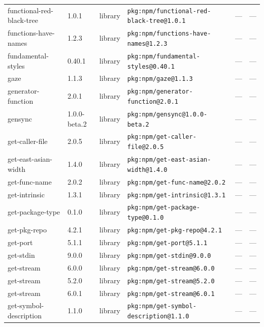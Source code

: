 \documentclass[11pt,a4paper]{article}
\begin{document}
\begin{longtable}{|p{4cm}|p{2cm}|p{1.6cm}|p{5cm}|p{1.5cm}|p{3.5cm}|}
\raggedright functional-red-black-tree & 1.0.1 & library & \small\texttt{pkg:npm/functional-red-black-tree@1.0.1} & — & \small — \\
\raggedright functions-have-names & 1.2.3 & library & \small\texttt{pkg:npm/functions-have-names@1.2.3} & — & \small — \\
\raggedright fundamental-styles & 0.40.1 & library & \small\texttt{pkg:npm/fundamental-styles@0.40.1} & — & \small — \\
\raggedright gaze & 1.1.3 & library & \small\texttt{pkg:npm/gaze@1.1.3} & — & \small — \\
\raggedright generator-function & 2.0.1 & library & \small\texttt{pkg:npm/generator-function@2.0.1} & — & \small — \\
\raggedright gensync & 1.0.0-beta.2 & library & \small\texttt{pkg:npm/gensync@1.0.0-beta.2} & — & \small — \\
\raggedright get-caller-file & 2.0.5 & library & \small\texttt{pkg:npm/get-caller-file@2.0.5} & — & \small — \\
\raggedright get-east-asian-width & 1.4.0 & library & \small\texttt{pkg:npm/get-east-asian-width@1.4.0} & — & \small — \\
\raggedright get-func-name & 2.0.2 & library & \small\texttt{pkg:npm/get-func-name@2.0.2} & — & \small — \\
\raggedright get-intrinsic & 1.3.1 & library & \small\texttt{pkg:npm/get-intrinsic@1.3.1} & — & \small — \\
\raggedright get-package-type & 0.1.0 & library & \small\texttt{pkg:npm/get-package-type@0.1.0} & — & \small — \\
\raggedright get-pkg-repo & 4.2.1 & library & \small\texttt{pkg:npm/get-pkg-repo@4.2.1} & — & \small — \\
\raggedright get-port & 5.1.1 & library & \small\texttt{pkg:npm/get-port@5.1.1} & — & \small — \\
\raggedright get-stdin & 9.0.0 & library & \small\texttt{pkg:npm/get-stdin@9.0.0} & — & \small — \\
\raggedright get-stream & 6.0.0 & library & \small\texttt{pkg:npm/get-stream@6.0.0} & — & \small — \\
\raggedright get-stream & 5.2.0 & library & \small\texttt{pkg:npm/get-stream@5.2.0} & — & \small — \\
\raggedright get-stream & 6.0.1 & library & \small\texttt{pkg:npm/get-stream@6.0.1} & — & \small — \\
\raggedright get-symbol-description & 1.1.0 & library & \small\texttt{pkg:npm/get-symbol-description@1.1.0} & — & \small — \\

\end{longtable}
\end{document}
